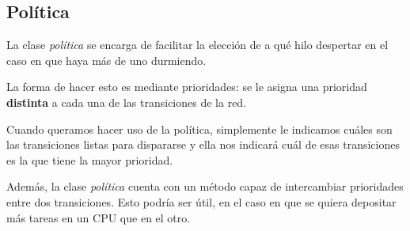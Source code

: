 \documentclass{article}
\begin{document}
    \subsection{Política}
    La clase \emph{política} se encarga de facilitar la elección de a qué hilo despertar en 
    el caso en que haya más de uno durmiendo. \par
    La forma de hacer esto es mediante prioridades: se le asigna una prioridad \textbf{distinta}
    a cada una de las transiciones de la red. \par
    Cuando queramos hacer uso de la política, simplemente le indicamos cuáles son las
    transiciones listas para dispararse y ella nos indicará cuál de esas transiciones es la
    que tiene la mayor prioridad. \par
    Además, la clase \emph{política} cuenta con un método capaz de intercambiar prioridades
    entre dos transiciones. Esto podría ser útil, en el caso en que se quiera depositar más
    tareas en un CPU que en el otro.
\end{document}
